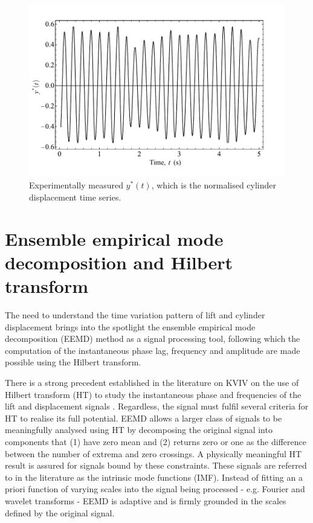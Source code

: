 \documentclass[oneside]{utmthesis}
\begin{document}
\begin{figure}
  \centering
  \includegraphics[width=1\textwidth]{figs/figure5}
  \caption{Experimentally measured $y^{*}(t)$, which is the normalised cylinder displacement time series.}
  \label{fig:sampTimeHist}
\end{figure}

\section{Ensemble empirical mode decomposition and Hilbert transform} \label{sec:eemd}
The need to understand the time variation pattern of lift and cylinder displacement brings into the spotlight the ensemble empirical mode decomposition (EEMD) method \citep{Huang1998,Wu2008} as a signal processing tool, following which the computation of the instantaneous phase lag, frequency and amplitude are made possible using the Hilbert transform.

There is a strong precedent established in the literature on KVIV on the use of Hilbert transform (HT) to study the instantaneous phase and frequencies of the lift and displacement signals \citep{Khalak1999}. Regardless, the signal must fulfil several criteria for HT to realise its full potential. EEMD allows a larger class of signals to be meaningfully analysed using HT by decomposing the original signal into components that (1) have zero mean and (2) returns zero or one as the difference between the number of extrema and zero crossings. A physically meaningful HT result is assured for signals bound by these constraints. These signals are referred to in the literature as the intrinsic mode functions (IMF). Instead of fitting an a priori function of varying scales into the signal being processed - e.g. Fourier and wavelet transforms - EEMD is adaptive and is firmly grounded in the scales defined by the original signal.
\end{document}
